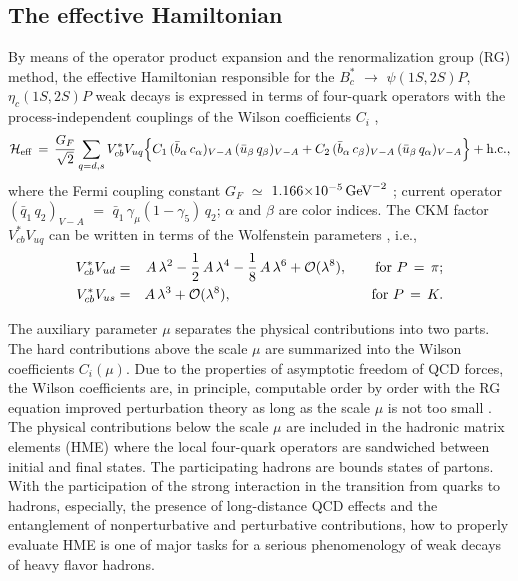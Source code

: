 \documentclass[preprint,superscriptaddress,nofootinbib]{revtex4}
\begin{document}
  \subsection{The effective Hamiltonian}
  \label{sec0201}
  By means of the operator product expansion and the renormalization
  group (RG) method, the effective Hamiltonian responsible for the
  $B_{c}^{\ast}$ ${\to}$ ${\psi}(1S,2S)P$, ${\eta}_{c}(1S,2S)P$ weak
  decays is expressed in terms of four-quark operators with the
  process-independent couplings of the Wilson coefficients
  $C_{i}$ \cite{9512380},
   \begin{equation}
  {\cal H}_{\rm eff}\, =\, \frac{G_{F}}{\sqrt{2}}
   \sum\limits_{q=d,s} V_{cb}^{\ast} V_{uq} \Big\{
    C_{1}\, ( \bar{b}_{\alpha}\, c_{\alpha} )_{V-A}\,
            ( \bar{u}_{\beta}\, q_{\beta} )_{V-A}
  + C_{2}\, ( \bar{b}_{\alpha}\, c_{\beta} )_{V-A}\,
            ( \bar{u}_{\beta}\, q_{\alpha} )_{V-A} \Big\}
   + {\rm h.c.}
   \label{hamilton},
   \end{equation}
  where the Fermi coupling constant $G_{F}$ ${\simeq}$
  $1.166{\times}10^{-5}\,{\rm GeV}^{-2}$ \cite{pdg};
  current operator $(\bar{q}_{1}\,q_{2})_{V-A}$ $=$
  $\bar{q}_{1}\,{\gamma}_{\mu}(1-{\gamma}_{5})\,q_{2}$;
  ${\alpha}$ and ${\beta}$ are color indices.
  The CKM factor $V_{cb}^{\ast}V_{uq}$
  can be written in terms of the Wolfenstein parameters \cite{pdg},
  i.e.,
   \begin{eqnarray}
   V_{cb}^{\ast} V_{ud} &=&
   A\,{\lambda}^{2}-\frac{1}{2}\,A\,{\lambda}^{4}
   -\frac{1}{8}\,A\,{\lambda}^{6}+{\cal O}({\lambda}^{8}),
   \qquad \text{for } P\, =\, {\pi}
   \label{ckm-pi}; \\
   V_{cb}^{\ast} V_{us} &=&
   A\,{\lambda}^{3}+{\cal O}({\lambda}^{8}),
   \qquad \qquad \qquad \qquad \qquad \text{for } P\, =\, K
   \label{ckm-k}.
   \end{eqnarray}

  The auxiliary parameter ${\mu}$ separates the physical contributions
  into two parts. The hard contributions above the scale ${\mu}$ are
  summarized into the Wilson coefficients $C_{i}(\mu)$.
  Due to the properties of asymptotic freedom of QCD forces, the
  Wilson coefficients are, in principle, computable order by order
  with the RG equation improved perturbation theory as long as the
  scale ${\mu}$ is not too small \cite{9512380}.
  The physical contributions below the scale ${\mu}$ are included in
  the hadronic matrix elements (HME) where the local four-quark operators
  are sandwiched between initial and final states.
  The participating hadrons are bounds states of partons.
  With the participation of the strong interaction in the transition
  from quarks to hadrons, especially, the
  presence of long-distance QCD effects and the entanglement of
  nonperturbative and perturbative contributions, how to properly
  evaluate HME is one of major tasks for a serious phenomenology
  of weak decays of heavy flavor hadrons.
\end{document}
